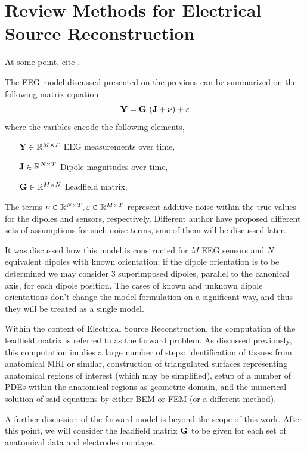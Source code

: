\chapter{Review Methods for Electrical Source Reconstruction}


\label{ch:review}

At some point, cite \cite{grech2008review}.

The EEG model discussed presented on the previous can be summarized on the following matrix equation
\begin{equation}
\mathbf{Y} = \mathbf{G}\, \left(  \mathbf{J} + \nu  \right) + \varepsilon
\label{eq:general}
\end{equation}
where the varibles encode the following elements,
\begin{itemize}
\item[$\mathbf{Y} \in \mathbb{R}^{M\times T}$] EEG measurements over time,
\item[$\mathbf{J} \in \mathbb{R}^{N\times T}$] Dipole magnitudes over time,
\item[$\mathbf{G} \in \mathbb{R}^{M\times N}$] Leadfield matrix,
\end{itemize}
%
The terms $\nu \in \mathbb{R}^{N\times T}, \varepsilon\in\mathbb{R}^{M\times T}$ represent additive noise within the true values for the dipoles and sensors, respectively. 
%
Different author have proposed different sets of assumptions for such noise terms, sme of them will be discussed later.

It was discussed how this model is constructed for $M$ EEG sensors and $N$ equivalent dipoles with known orientation; if the dipole orientation is to be determined we may consider 3 superimposed dipoles, parallel to the canonical axis, for each dipole position.
%
The cases of known and unknown dipole orientations don't change the model formulation on a significant way, and thus they will be treated as a single model.

Within the context of Electrical Source Reconstruction, the computation of the leadfield matrix is referred to as the forward problem.
%
As discussed previously, this computation implies a large number of steps: identification of tissues from anatomical MRI or similar, construction of triangulated surfaces representing anatomical regions of interest (which may be simplified), setup of a number of PDEs within the anatomical regions as geometric domain, and the numerical solution of said equations by either BEM or FEM (or a different method).

A further discussion of the forward model is beyond the scope of this work.
%
After this point, we will consider the leadfield matrix $\mathbf{G}$ to be given for each set of anatomical data and electrodes montage.

